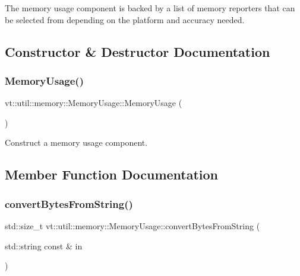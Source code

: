The memory usage component is backed by a list of memory reporters that can be selected from depending on the platform and accuracy needed. 

\subsection{Constructor \& Destructor Documentation}
\mbox{\label{structvt_1_1util_1_1memory_1_1_memory_usage_a5838280c7b2b24ab8ed2aff450b5e98f}} 
\subsubsection{\texorpdfstring{Memory\+Usage()}{MemoryUsage()}}
{\footnotesize\ttfamily vt\+::util\+::memory\+::\+Memory\+Usage\+::\+Memory\+Usage (\begin{DoxyParamCaption}{ }\end{DoxyParamCaption})}



Construct a memory usage component. 



\subsection{Member Function Documentation}
\mbox{\label{structvt_1_1util_1_1memory_1_1_memory_usage_ad047c8acc218403b53ec97c82fa7d7e3}} 
\subsubsection{\texorpdfstring{convert\+Bytes\+From\+String()}{convertBytesFromString()}}
{\footnotesize\ttfamily std\+::size\+\_\+t vt\+::util\+::memory\+::\+Memory\+Usage\+::convert\+Bytes\+From\+String (\begin{DoxyParamCaption}\item[{std\+::string const \&}]{in }\end{DoxyParamCaption})}



